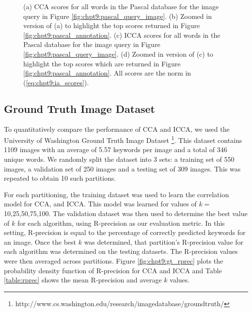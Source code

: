 \begin{figure}[t]
{    \label{fig:chpt9:icca_ia_zoom}}
  \caption{(a) CCA scores for all words in the Pascal database for the image query in
    Figure \ref{fig:chpt9:pascal_query_image}. (b) Zoomed in version of (a) to highlight
    the top scores returned in Figure \ref{fig:chpt9:pascal_annotation}. (c) ICCA scores
    for all words in the Pascal database for the image query in Figure
    \ref{fig:chpt9:pascal_query_image}. (d) Zoomed in version of (c) to highlight the top
    scores which are returned in Figure \ref{fig:chpt9:pascal_annotation}. All
    scores are the norm in (\ref{eq:chpt9:ia_scores}).}
  \label{fig:chpt9:pascal_ia}
\end{figure}

\subsection{Ground Truth Image Dataset}

To quantitatively compare the performance of CCA and ICCA, we used the University of
Washington Ground Truth Image Dataset
\footnote{http://www.cs.washington.edu/research/imagedatabase/groundtruth/}. This
dataset contains 1109 images with an average of 5.57 keywords per image and a total of 346
unique words. We randomly split the dataset into 3 sets: a training set of 550 images, a
validation set of 250 images and a testing set of 309 images. This was repeated to obtain
10 such partitions.

For each partitioning, the training dataset was used to learn the correlation model for
CCA, and ICCA. This model was learned for values of $k=$10,25,50,75,100.  The validation
dataset was then used to determine the best value of $k$ for each algorithm, using
R-precision as our evaluation metric. In this setting, R-precision is equal to the
percentage of correctly predicted keywords for an image. Once the best $k$ was determined,
that partition's R-precision value for each algorithm was determined on the testing
datasets. The R-precision values were then averaged across partitions. Figure
\ref{fig:chpt9:gt_rprec} plots the probability density function of R-precision for CCA and
ICCA and Table \ref{table:rprec} shows the mean R-precision and average $k$
values.

